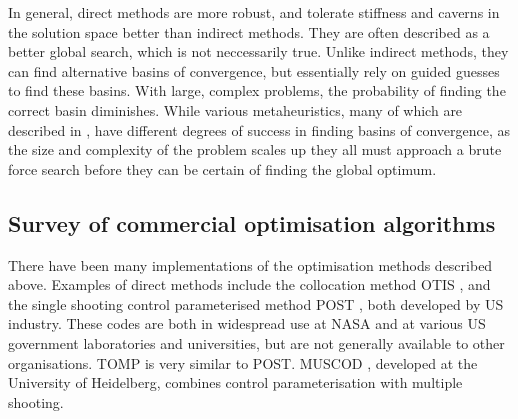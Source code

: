 


In general, direct methods are more robust, and tolerate stiffness and caverns in the solution space better than indirect methods. They are often described as a better global search, which is not neccessarily true. Unlike indirect methods, they can find alternative basins of convergence, but essentially rely on guided guesses to find these basins. With large, complex problems, the probability of finding the correct basin diminishes. While various metaheuristics, many of which are described in \textcite{Dreo2006}, have different degrees of success in finding basins of convergence, as the size and complexity of the problem scales up they all must approach a brute force search before they can be certain of finding the global optimum.




\subsection{Survey of commercial optimisation algorithms} \label{sec:Algorithms}

There have been many implementations of the optimisation methods described above. Examples of direct methods include the collocation method OTIS \parencite[Optimal Trajectories by Implicit Simulation, ][]{Hargraves1987}, and the single shooting control parameterised method POST \parencite[Program to Optimize Simulated Trajectories, ][]{Brauer1977}, both developed by US industry. These codes are both in widespread use at NASA and at various US government laboratories and universities, but are not generally available to other organisations. TOMP \parencite[Trajectory Optimization by Mathematical Programming, ][]{Kraft1994} is very similar to POST. MUSCOD \parencite[Multiple Shooting Code for optimization, ][]{Bock1984}, developed at the University of Heidelberg, combines control parameterisation with multiple shooting. 

